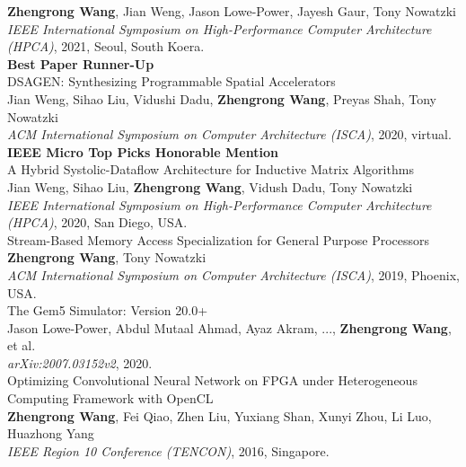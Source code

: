\documentclass[a4paper]{article}
\newenvironment{changemargin}[2]{%
  \begin{list}{}{%
    \setlength{\topsep}{0pt}%
    \setlength{\leftmargin}{#1}%
    \setlength{\rightmargin}{#2}%
    \setlength{\listparindent}{\parindent}%
    \setlength{\itemindent}{\parindent}%
    \setlength{\parsep}{\parskip}%
  }%
  \item[]}{\end{list}
}
\newenvironment{body} {
	\vspace*{-16pt}
	\begin{changemargin}{-0.5in}{-0.5in}
  }	
	{\end{changemargin}
}
\begin{document}
\begin{body}
	\textbf{Zhengrong Wang}, Jian Weng, Jason Lowe-Power, Jayesh Gaur, Tony Nowatzki \\
	\emph{IEEE International Symposium on High-Performance Computer Architecture (HPCA)}, 2021, Seoul, South Koera.\\
	\textbf{Best Paper Runner-Up} \\
	\vspace{6pt}
	DSAGEN: Synthesizing Programmable Spatial Accelerators \\
	Jian Weng, Sihao Liu, Vidushi Dadu, \textbf{Zhengrong Wang}, Preyas Shah, Tony Nowatzki \\
	\emph{ACM International Symposium on Computer Architecture (ISCA)}, 2020, virtual.\\
	\textbf{IEEE Micro Top Picks Honorable Mention}\\
	\vspace{6pt}
	A Hybrid Systolic-Dataflow Architecture for Inductive Matrix Algorithms\\
	Jian Weng, Sihao Liu, \textbf{Zhengrong Wang}, Vidush Dadu, Tony Nowatzki \\
	\emph{IEEE International Symposium on High-Performance Computer Architecture (HPCA)}, 2020, San Diego, USA.\\
	\vspace{6pt}
	Stream-Based Memory Access Specialization for General Purpose Processors\\
	\textbf{Zhengrong Wang}, Tony Nowatzki \\
	\emph{ACM International Symposium on Computer Architecture (ISCA)}, 2019, Phoenix, USA.\\
	\vspace{6pt}
	The Gem5 Simulator: Version 20.0+\\
	Jason Lowe-Power, Abdul Mutaal Ahmad, Ayaz Akram, ..., \textbf{Zhengrong Wang}, et al. \\
	\emph{arXiv:2007.03152v2}, 2020.\\
	\vspace{6pt}
	Optimizing Convolutional Neural Network on FPGA under Heterogeneous Computing Framework with OpenCL\\
	\textbf{Zhengrong Wang}, Fei Qiao, Zhen Liu, Yuxiang Shan, Xunyi Zhou, Li Luo, Huazhong Yang \\
	\emph{IEEE Region 10 Conference (TENCON)}, 2016, Singapore.\\
\end{body}

\smallskip
\smallskip
\end{document}
